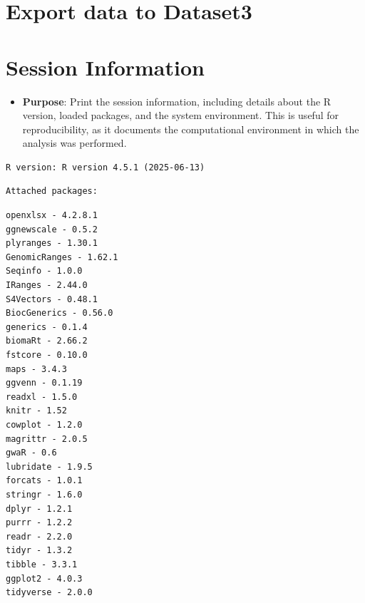 \documentclass[
  11pt,
]{article}
\providecommand{\tightlist}{%
  \setlength{\itemsep}{0pt}\setlength{\parskip}{0pt}}\usepackage{longtable,booktabs,array}
\begin{document}
\section{Export data to Dataset3}\label{export-data-to-dataset3}

\section{Session Information}\label{session-information}

\begin{itemize}
\tightlist
\item
  \textbf{Purpose}: Print the session information, including details
  about the R version, loaded packages, and the system environment. This
  is useful for reproducibility, as it documents the computational
  environment in which the analysis was performed.
\end{itemize}

\begin{verbatim}
R version: R version 4.5.1 (2025-06-13) 
\end{verbatim}

\begin{verbatim}
Attached packages:
\end{verbatim}

\begin{verbatim}
openxlsx - 4.2.8.1 
ggnewscale - 0.5.2 
plyranges - 1.30.1 
GenomicRanges - 1.62.1 
Seqinfo - 1.0.0 
IRanges - 2.44.0 
S4Vectors - 0.48.1 
BiocGenerics - 0.56.0 
generics - 0.1.4 
biomaRt - 2.66.2 
fstcore - 0.10.0 
maps - 3.4.3 
ggvenn - 0.1.19 
readxl - 1.5.0 
knitr - 1.52 
cowplot - 1.2.0 
magrittr - 2.0.5 
gwaR - 0.6 
lubridate - 1.9.5 
forcats - 1.0.1 
stringr - 1.6.0 
dplyr - 1.2.1 
purrr - 1.2.2 
readr - 2.2.0 
tidyr - 1.3.2 
tibble - 3.3.1 
ggplot2 - 4.0.3 
tidyverse - 2.0.0 
\end{verbatim}
\end{document}
